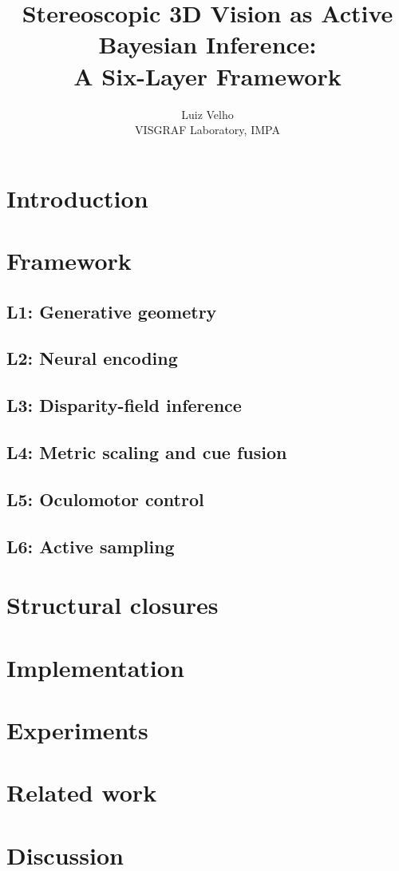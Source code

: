 \documentclass[11pt]{article}
\title{Stereoscopic 3D Vision as Active Bayesian Inference:\\A Six-Layer Framework}
\author{Luiz Velho\\VISGRAF Laboratory, IMPA}
\begin{document}
\maketitle

\begin{abstract}
\end{abstract}

\section{Introduction}
\label{sec:intro}

\section{Framework}
\label{sec:framework}

\subsection{L1: Generative geometry}
\subsection{L2: Neural encoding}
\subsection{L3: Disparity-field inference}
\subsection{L4: Metric scaling and cue fusion}
\subsection{L5: Oculomotor control}
\subsection{L6: Active sampling}

\section{Structural closures}
\label{sec:closures}

\section{Implementation}
\label{sec:implementation}

\section{Experiments}
\label{sec:experiments}

\section{Related work}
\label{sec:related}

\section{Discussion}



\end{document}

